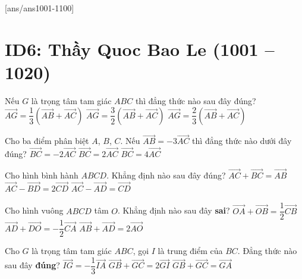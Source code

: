 [ans/ans1001-1100]
\setcounter{ex}{1000}
\section*{ID6: Thầy Quoc Bao Le (1001 -- 1020)}
\begin{ex}%
	Nếu $G$ là trọng tâm tam giác $ABC$ thì đẳng thức nào sau đây đúng?
	{\True$\vec{AG}=\dfrac{1}{3}\left(\vec{AB}+\vec{AC}\right)$}
	{$\vec{AG}=\dfrac{3}{2}\left(\vec{AB}+\vec{AC}\right)$}
	{$\vec{AG}=\dfrac{2}{3}\left(\vec{AB}+\vec{AC}\right)$}		
\end{ex}
\begin{ex}%
	Cho ba điểm phân biệt $A$, $B$, $C$. Nếu $\vec{AB}=-3\vec{AC}$ thì đẳng thức nào dưới đây đúng?
	{$\vec{BC}=-2\vec{AC}$}
	{$\vec{BC}=2\vec{AC}$}
	{\True$\vec{BC}=4\vec{AC}$}
\end{ex}

\begin{ex}%
	Cho hình bình hành $ABCD$. Khẳng định nào sau đây đúng?
	{$\vec{AC}+\vec{BC}=\vec{AB}$}
	{$\vec{AC}-\vec{BD}=2\vec{CD}$}
	{$\vec{AC}-\vec{AD}=\vec{CD}$}	
\end{ex}

\begin{ex}%
	Cho hình vuông $ABCD$ tâm $O$. Khẳng định nào sau đây \textbf{sai}?
	{\True$\vec{OA}+\vec{OB}=\dfrac{1}{2}\vec{CB}$}
	{$\vec{AD}+\vec{DO}=-\dfrac{1}{2}\vec{CA}$}
	{$\vec{AB}+\vec{AD}=2\vec{AO}$}	
\end{ex}

\begin{ex}%
	Cho $G$ là trọng tâm tam giác $ABC$, gọi $I$ là trung điểm của $BC$. Đẳng thức nào sau đây \textbf{đúng}?
	{$\vec{IG}=-\dfrac{1}{3}\vec{IA}$}
	{\True$\vec{GB}+\vec{GC}=2\vec{GI}$}
	{$\vec{GB}+\vec{GC}=\vec{GA}$}	
\end{ex}

